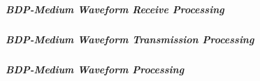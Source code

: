 \subparagraph{BDP-Medium \FM Waveform Receive Processing}
\label{Waveform_FM_Receive_Medium}




\subparagraph{BDP-Medium \FM Waveform Transmission Processing}
\label{Waveform_FM_Transmission_Medium}




\subparagraph{BDP-Medium \FM Waveform \VSWR Processing}
\label{Waveform_FM_VSWR_Medium}

